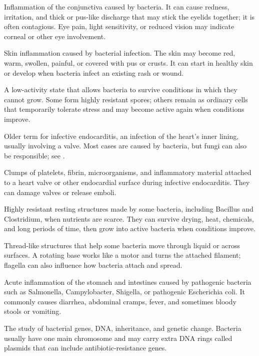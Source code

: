  Inflammation of the conjunctiva caused by bacteria. It can cause redness, irritation, and thick or pus-like discharge that may stick the eyelids together; it is often contagious. Eye pain, light sensitivity, or reduced vision may indicate corneal or other eye involvement.

 Skin inflammation caused by bacterial infection. The skin may become red, warm, swollen, painful, or covered with pus or crusts. It can start in healthy skin or develop when bacteria infect an existing rash or wound.

 A low-activity state that allows bacteria to survive conditions in which they cannot grow. Some form highly resistant spores; others remain as ordinary cells that temporarily tolerate stress and may become active again when conditions improve.

 Older term for infective endocarditis, an infection of the heart’s inner lining, usually involving a valve. Most cases are caused by bacteria, but fungi can also be responsible; see .

 Clumps of platelets, fibrin, microorganisms, and inflammatory material attached to a heart valve or other endocardial surface during infective endocarditis. They can damage valves or release emboli.

 Highly resistant resting structures made by some bacteria, including Bacillus and Clostridium, when nutrients are scarce. They can survive drying, heat, chemicals, and long periods of time, then grow into active bacteria when conditions improve.

 Thread-like structures that help some bacteria move through liquid or across surfaces. A rotating base works like a motor and turns the attached filament; flagella can also influence how bacteria attach and spread.

 Acute inflammation of the stomach and intestines caused by pathogenic bacteria such as
Salmonella, Campylobacter, Shigella, or pathogenic Escherichia coli. It commonly causes
diarrhea, abdominal cramps, fever, and sometimes bloody stools or vomiting.

 The study of bacterial genes, DNA, inheritance, and genetic change. Bacteria usually have one main chromosome and may carry extra DNA rings called plasmids that can include antibiotic-resistance genes.

